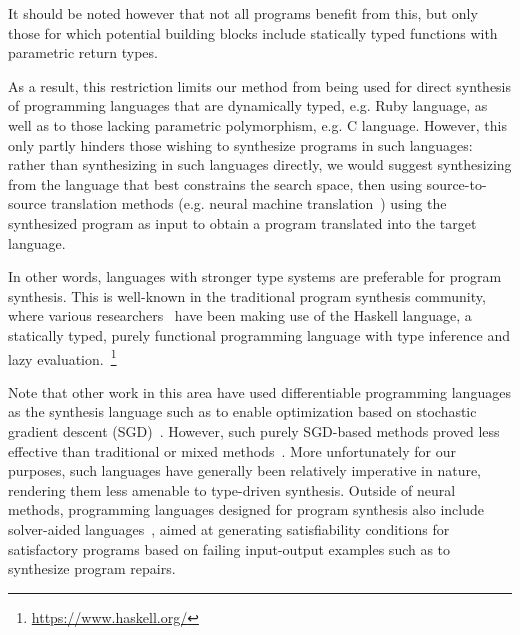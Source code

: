\documentclass{article}
\begin{document}
It should be noted however that not all programs benefit from this,
but only those for which potential building blocks include statically typed functions with parametric return types.

As a result, this restriction limits our method from being used for direct synthesis of programming languages that are dynamically typed,
e.g. Ruby language, as well as to those lacking parametric polymorphism, e.g. C language.
However, this only partly hinders those wishing to synthesize programs in such languages:
rather than synthesizing in such languages directly, we would suggest synthesizing from the language that best constrains the search space,
then using source-to-source translation methods (e.g. neural machine translation~\citep{kalchbrenner2013recurrent})
using the synthesized program as input to obtain a program translated into the target language.


In other words, languages with stronger type systems are preferable for program synthesis.
This is well-known in the traditional program synthesis community,
where various researchers~\citep{synquid,hornclauses,scythe,gissurarson2018suggesting}
have been making use of the Haskell language,
a statically typed, purely functional programming language with type inference and lazy evaluation.~\footnote{\url{https://www.haskell.org/}}

Note that other work in this area have used differentiable programming languages
as the synthesis language such as to enable optimization based on
stochastic gradient descent (SGD)~\citep{forth,terpret}.
However, such purely SGD-based methods proved less effective than traditional or mixed methods~\citep{terpret}.
More unfortunately for our purposes, such languages have generally been relatively imperative in nature,
rendering them less amenable to type-driven synthesis.
Outside of neural methods, programming languages designed for program synthesis also include solver-aided languages~\citep{rosette},
aimed at generating satisfiability conditions for satisfactory programs based on failing input-output examples such as to synthesize program repairs.
\end{document}
